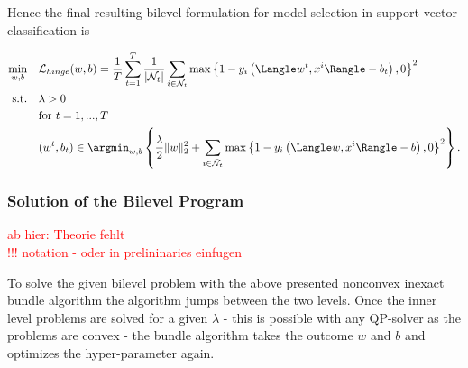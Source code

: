 
Hence the final resulting bilevel formulation for model selection in support vector classification is 

%

\begin{align}
\begin{split}
	\min_{w,b} \quad &  \mathcal{L}_{hinge}(w,b) = \frac{1}{T}\sum_{t=1}^T\frac{1}{|\mathcal{N}_t|}\sum_{i \in \mathcal{N}_t}{\max\left\{1-y_i\left(\Langle w^t,x^i\Rangle-b_t\right),0\right\}^2}\\
	\text{s.t.} \quad & \lambda > 0 \\
	& \text{for } t = 1,...,T \\
	& (w^t,b_t) \in \argmin_{w,b}\left\{ \frac{\lambda}{2} \|w\|^2_2+\sum_{i\in \bar{\mathcal{N}}_t}\max\left\{1-y_i\left(\Langle w,x^i\Rangle-b\right),0\right\}^2\right\}. \\
\end{split}
\label{model_2}
\end{align}


\subsubsection{Solution of the Bilevel Program}

\textcolor{red}{ab hier: Theorie fehlt\\
!!! notation - oder in prelininaries einfugen}

To solve the given bilevel problem with the above presented nonconvex inexact bundle algorithm the algorithm jumps between the two levels. Once the inner level problems are solved for a given \(\lambda\) - this is possible with any QP-solver as the problems are convex - the bundle algorithm takes the outcome \(w\) and \(b\) and optimizes the hyper-parameter again.

